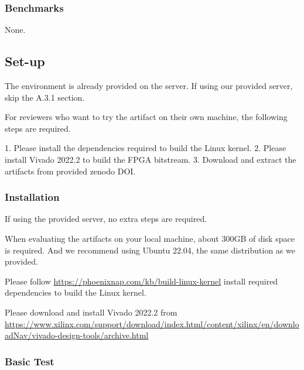 \subsubsection{Benchmarks}
None.

\subsection{Set-up}


The environment is already provided on the server. If using our provided server, skip the A.3.1 section.

For reviewers who want to try the artifact on their own machine, the following steps are required.

1. Please install the dependencies required to build the Linux kernel. 2. Please install Vivado 2022.2 to build the FPGA bitstream. 3. Download and extract the artifacts from provided zenodo DOI.

\subsubsection{Installation}
If using the provided server, no extra steps are required.

When evaluating the artifacts on your local machine, about 300GB of disk space is required. And we recommend using Ubuntu 22.04, the same distribution as we provided.

Please follow \url{https://phoenixnap.com/kb/build-linux-kernel} install required dependencies to build the Linux kernel.

Please download and install Vivado 2022.2 from \url{https://www.xilinx.com/support/download/index.html/content/xilinx/en/downloadNav/vivado-design-tools/archive.html}

\subsubsection{Basic Test}

